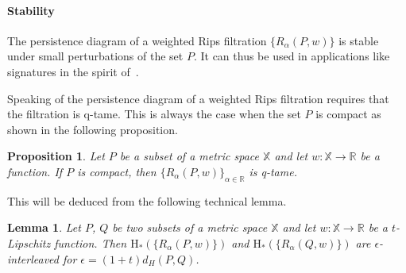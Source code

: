 \documentclass[a4paper]{article}
\newcommand\X{\mathbb{X}}
\newcommand\R{\mathbb{R}}
\newtheorem{lemma}[theorem]{Lemma}
\newtheorem{proposition}[theorem]{Proposition}
\newcommand{\Hom}{\mathrm{H_*}}
\begin{document}
\paragraph{Stability\\}
The persistence diagram of a weighted Rips filtration $\{R_\alpha(P,w)\}$ is stable under small perturbations of the set $P$. 
It can thus be used in applications like signatures in the spirit of~\cite{ghssspCCGMO}.

Speaking of the persistence diagram of a weighted Rips filtration requires that the filtration is q-tame.
This is always the case when the set $P$ is compact as shown in the following proposition.

\begin{proposition}\label{pCompQTame}
Let $P$ be a subset of a metric space $\X$ and let $w:\X\to\R$ be a function.
If $P$ is compact, then $\{R_\alpha(P,w)\}_{\alpha\in\R}$ is q-tame.
\end{proposition}
This will be deduced from the following technical lemma.

\begin{lemma}\label{lHausInter}
Let $P$, $Q$ be two subsets of a metric space $\X$ and let $w:\X\to\R$ be a $t$-Lipschitz function.
Then $\Hom(\{R_\alpha(P,w)\})$ and $\Hom(\{R_\alpha(Q,w)\})$ are $\epsilon$-interleaved for $\epsilon=(1+t)d_H(P,Q)$.
\end{lemma}
\end{document}
